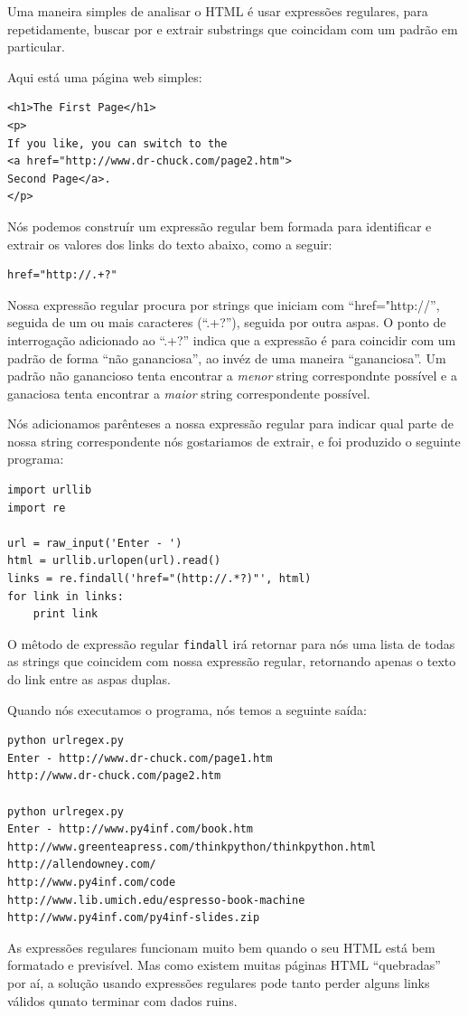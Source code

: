 Uma maneira simples de analisar o HTML é usar expressões regulares, para
repetidamente, buscar por e extrair substrings que coincidam com um
padrão em particular.

Aqui está uma página web simples:

\beforeverb
\begin{verbatim}
<h1>The First Page</h1>
<p>
If you like, you can switch to the
<a href="http://www.dr-chuck.com/page2.htm">
Second Page</a>.
</p>
\end{verbatim}
\afterverb
%
Nós podemos construír um expressão regular bem formada para
identificar e extrair os valores dos links do texto abaixo,
como a seguir:

\beforeverb
\begin{verbatim}
href="http://.+?"
\end{verbatim}
\afterverb
%
Nossa expressão regular procura por strings que iniciam com
``href="http://'', seguida de um ou mais caracteres
(``.+?''), seguida por outra aspas.  O ponto de interrogação 
adicionado ao ``.+?'' indica que a expressão é para coincidir
com um padrão de forma ``não gananciosa'', ao invéz de uma
maneira ``gananciosa''. Um padrão não ganancioso tenta encontrar
a {\em menor} string correspondnte possível e a ganaciosa tenta
encontrar a {\em maior} string correspondente possível.

Nós adicionamos parênteses a nossa expressão regular para indicar
qual parte de nossa string correspondente nós gostariamos de extrair, e
foi produzido o seguinte programa:

\beforeverb
\begin{verbatim}
import urllib
import re

url = raw_input('Enter - ')
html = urllib.urlopen(url).read()
links = re.findall('href="(http://.*?)"', html)
for link in links:
    print link
\end{verbatim}
\afterverb
%
O mêtodo de expressão regular {\tt findall} irá retornar para nós uma
lista de todas as strings que coincidem com nossa expressão regular,
retornando apenas o texto do link entre as aspas duplas.

Quando nós executamos o programa, nós temos a seguinte saída:

\beforeverb
\begin{verbatim}
python urlregex.py 
Enter - http://www.dr-chuck.com/page1.htm
http://www.dr-chuck.com/page2.htm

python urlregex.py 
Enter - http://www.py4inf.com/book.htm
http://www.greenteapress.com/thinkpython/thinkpython.html
http://allendowney.com/
http://www.py4inf.com/code
http://www.lib.umich.edu/espresso-book-machine
http://www.py4inf.com/py4inf-slides.zip
\end{verbatim}
\afterverb
%
As expressões regulares funcionam muito bem quando o seu HTML está bem
formatado e previsível.  Mas como existem muitas páginas HTML ``quebradas''
por aí, a solução usando expressões regulares pode tanto perder alguns
links válidos qunato terminar com dados ruins.

